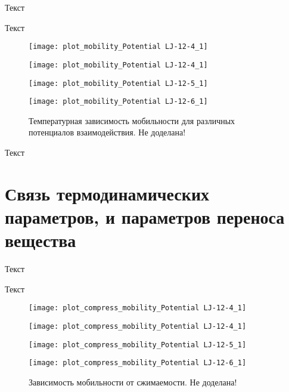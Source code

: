 Текст

Текст

\begin{figure}[htbp!]
\begin{center}
\begin{minipage}[h]{0.45\linewidth}
\texttt{[image: plot\_mobility\_Potential LJ-12-4\_1]}
\end{minipage}
\begin{minipage}[h]{0.45\linewidth}
\texttt{[image: plot\_mobility\_Potential LJ-12-4\_1]}
\end{minipage}


\begin{minipage}[h]{0.45\linewidth}
\texttt{[image: plot\_mobility\_Potential LJ-12-5\_1]}
\end{minipage}
\begin{minipage}[h]{0.45\linewidth}
\texttt{[image: plot\_mobility\_Potential LJ-12-6\_1]}
\end{minipage}
\caption{Температурная зависимость мобильности для различных потенциалов взаимодействия. Не доделана!}
\label{ris19}
\end{center}
\end{figure}

Текст

\section{Связь термодинамических параметров, и параметров переноса вещества}\label{C3_2}

Текст

Текст

\begin{figure}[htbp!]
\begin{center}
\begin{minipage}[h]{0.45\linewidth}
\texttt{[image: plot\_compress\_mobility\_Potential LJ-12-4\_1]}
\end{minipage}
\begin{minipage}[h]{0.45\linewidth}
\texttt{[image: plot\_compress\_mobility\_Potential LJ-12-4\_1]}
\end{minipage}


\begin{minipage}[h]{0.45\linewidth}
\texttt{[image: plot\_compress\_mobility\_Potential LJ-12-5\_1]}
\end{minipage}
\begin{minipage}[h]{0.45\linewidth}
\texttt{[image: plot\_compress\_mobility\_Potential LJ-12-6\_1]}
\end{minipage}
\caption{Зависимость мобильности от сжимаемости. Не доделана!}
\label{ris20}
\end{center}
\end{figure}

